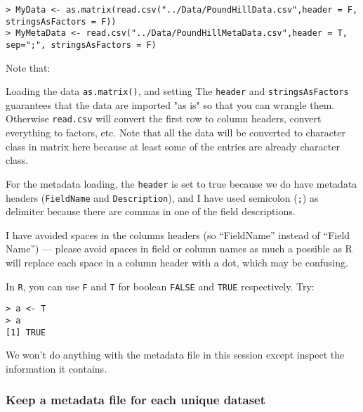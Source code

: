 \begin{lstlisting}
> MyData <- as.matrix(read.csv("../Data/PoundHillData.csv",header = F, 
stringsAsFactors = F))
> MyMetaData <- read.csv("../Data/PoundHillMetaData.csv",header = T, 
sep=";", stringsAsFactors = F)
\end{lstlisting}
Note that:
\begin{compactitem}
\item Loading the data {\tt as.matrix()}, and setting The {\tt header} 
and {\tt stringsAsFactors} guarantees that the data are imported "as 
is" so that you can wrangle them. Otherwise {\tt read.csv} will convert 
the first row to column headers, convert everything to factors, etc. 
Note that all the data will be converted to character class in matrix 
here because at least some of the entries are already character class.

\item For the metadata loading, the {\tt header} is set to true because 
we do have metadata headers ({\tt FieldName} and {\tt Description}), 
and I have used semicolon ({\tt ;}) as delimiter because there are 
commas in one of the field descriptions. 

\item I have avoided spaces in the columns headers (so ``FieldName'' 
instead of ``Field Name'') --- please avoid spaces in field or column 
names as much a possible as R will replace each space in a column 
header with a dot, which may be confusing.

\end{compactitem}

\begin{tipbox}
In {\tt R}, you can use {\tt F} and {\tt T} for boolean {\tt FALSE} 
and {\tt TRUE} respectively. Try:
\begin{lstlisting}
> a <- T
> a
[1] TRUE
\end{lstlisting}
\end{tipbox}

We won't do anything with the metadata file in this session except 
inspect the information it contains.   

\subsubsection{Keep a metadata file for each unique dataset} 

